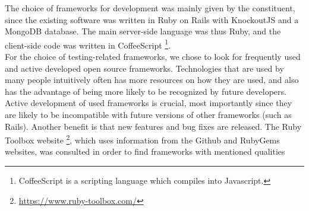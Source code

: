 
The choice of frameworks for development was mainly given by the
constituent, since the existing software was written in Ruby on Rails
with KnockoutJS and a MongoDB database. The main server-side language
was thus Ruby, and the client-side code was written in CoffeeScript
\footnote{CoffeeScript is a scripting language which compiles into
Javascript.}.\\

For the choice of testing-related frameworks, we chose to look for
frequently used and active developed open source frameworks.
Technologies that are used by many people intuitively often has more
resources on how they are used, and also has the advantage of being more
likely to be recognized by future developers. Active development of used
frameworks is crucial, most importantly since they are likely to be
incompatible with future versions of other frameworks (such as Rails).
Another benefit is that new features and bug fixes are released. The
Ruby Toolbox website \footnote{\url{https://www.ruby-toolbox.com/}},
which uses information from the Github and RubyGems websites, was
consulted in order to find frameworks with mentioned qualities

